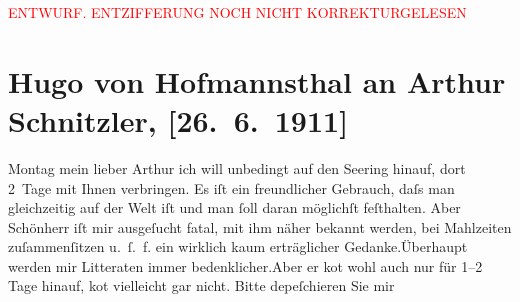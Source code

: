 
\begin{center}
            \textcolor{red}{ENTWURF. ENTZIFFERUNG NOCH NICHT KORREKTURGELESEN}
                      \end{center}
            
               \section[Hugo von Hofmannsthal an Arthur Schnitzler, {[}26. 6. 1911{]}]{ Hugo von Hofmannsthal an Arthur Schnitzler, {[}26. 6. 1911{]}}\nopagebreak{}\rehead{ }\begin{ledgroupsized}[t]{13cm}\normalsize\beginnumbering{} \toendnotes[C]{\smallbreak\pagebreak[2]} 
\pstart
           \raggedleft{}{\pb}Montag\pend
           \pstart{}mein lieber Arthur\pend\pstart
           ich will unbedingt auf den Se{\geminationm}ering hinauf, dort 2 Tage mit Ihnen verbringen. Es iſt ein
               freundlicher Gebrauch, daſs man gleichzeitig auf der Welt iſt und man ſoll daran
               möglichſt feſthalten.\pend
           \pstart
           Aber Schönherr iſt mir ausgeſucht fatal, mit ihm
               näher bekannt werden, bei Mahlzeiten {\pb}zuſammenſitzen u. ſ. f. ein
                  wirklich kaum erträglicher Gedanke.\hspace*{1.5em}Überhaupt werden mir Litteraten immer
                  bedenklicher.\hspace*{1.5em}Aber er ko{\geminationm}t wohl auch nur für 1–2 Tage hinauf, ko{\geminationm}t vielleicht gar nicht. Bitte depeſchieren Sie mir

\end{ledgroupsized}
